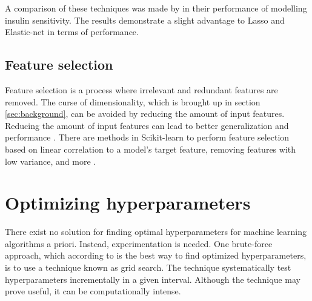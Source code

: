 	A comparison of these techniques was made by \cite{ARTICLE:21} in their performance of modelling insulin sensitivity. The results demonstrate a slight advantage to Lasso and Elastic-net in terms of performance. 

	\subsection{Feature selection} \label{sec:feature_selection}
		Feature selection is a process where irrelevant and redundant features are removed. The curse of dimensionality, which is brought up in section \ref{sec:background}, can be avoided by reducing the amount of input features. Reducing the amount of input features can lead to better generalization and performance \cite{ARTICLE:10, ARTICLE:22}. There are methods in Scikit-learn to perform feature selection based on linear correlation to a model's target feature, removing features with low variance, and more \cite{WEBSITE:30}.
	

	
\section{Optimizing hyperparameters} \label{sec:hyperparameters}
	There exist no solution for finding optimal hyperparameters for machine learning algorithms a priori. Instead, experimentation is needed. One brute-force approach, which according to \cite{BOOK:9} is the best way to find optimized hyperparameters, is to use a technique known as grid search. The technique systematically test hyperparameters incrementally in a given interval. Although the technique may prove useful, it can be computationally intense.

